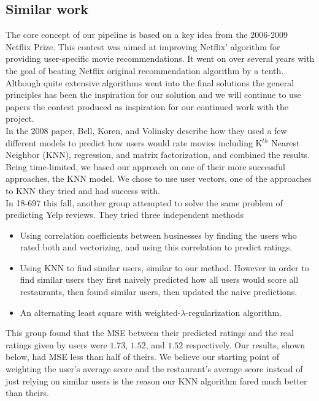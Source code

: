 \documentclass[10pt,twocolumn,letterpaper]{article}
\begin{document}
\subsection{Similar work}
The core concept of our pipeline is based on a key idea from the 2006-2009 Netflix Prize. This contest was aimed at improving Netflix' algorithm for providing user-specific movie recommendations. It went on over several years with the goal of beating Netflix original recommendation algorithm by a tenth. Although quite extensive algorithms went into the final solutions the general principles has been the inspiration for our solution and we will continue to use papers the contest produced as inspiration for our continued work with the project\cite{KorBell}\cite{BellKor}.\\

\indent In the 2008 paper, Bell, Koren, and Volinsky describe how they used a few different models to predict how users would rate movies including K$^{th}$ Nearest Neighbor (KNN), regression, and matrix factorization, and combined the results. Being time-limited, we based our approach on one of their more successful approaches, the KNN model. We chose to use user vectors, one of the approaches to KNN they tried and had success with.\\

\indent In 18-697 this fall, another group attempted to solve the same problem of predicting Yelp reviews. They tried three independent methods\cite{ClassPresentation}

\begin{itemize}
\item Using correlation coefficients between businesses by finding the users who rated both and vectorizing, and using this correlation to predict ratings.
\item Using KNN to find similar users, similar to our method. However in order to find similar users they first naively predicted how all users would score all restaurants, then found similar users, then updated the naive predictions.
\item An alternating least square with weighted-$\lambda$-regularization algorithm.
\end{itemize}

This group found that the MSE between their predicted ratings and the real ratings given by users were $1.73$, $1.52$, and $1.52$ respectively. Our results, shown below, had MSE less than half of theirs. We believe our starting point of weighting the user's average score and the restaurant's average score instead of just relying on similar users is the reason our KNN algorithm fared much better than theirs.
\end{document}
